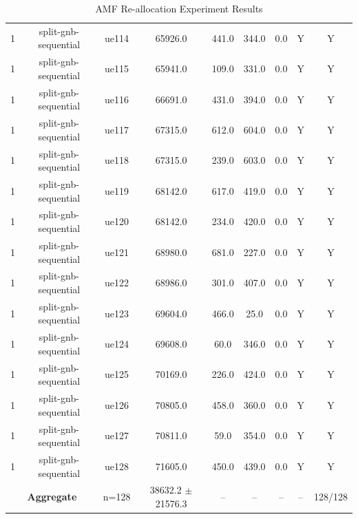 \begin{table}[ht]
\begin{tabular}{|c|c|c|c|c|c|c|c|c|}
1 & split-gnb-sequential & ue114 & 65926.0 & 441.0 & 344.0 & 0.0 & Y & Y \\
1 & split-gnb-sequential & ue115 & 65941.0 & 109.0 & 331.0 & 0.0 & Y & Y \\
1 & split-gnb-sequential & ue116 & 66691.0 & 431.0 & 394.0 & 0.0 & Y & Y \\
1 & split-gnb-sequential & ue117 & 67315.0 & 612.0 & 604.0 & 0.0 & Y & Y \\
1 & split-gnb-sequential & ue118 & 67315.0 & 239.0 & 603.0 & 0.0 & Y & Y \\
1 & split-gnb-sequential & ue119 & 68142.0 & 617.0 & 419.0 & 0.0 & Y & Y \\
1 & split-gnb-sequential & ue120 & 68142.0 & 234.0 & 420.0 & 0.0 & Y & Y \\
1 & split-gnb-sequential & ue121 & 68980.0 & 681.0 & 227.0 & 0.0 & Y & Y \\
1 & split-gnb-sequential & ue122 & 68986.0 & 301.0 & 407.0 & 0.0 & Y & Y \\
1 & split-gnb-sequential & ue123 & 69604.0 & 466.0 & 25.0 & 0.0 & Y & Y \\
1 & split-gnb-sequential & ue124 & 69608.0 & 60.0 & 346.0 & 0.0 & Y & Y \\
1 & split-gnb-sequential & ue125 & 70169.0 & 226.0 & 424.0 & 0.0 & Y & Y \\
1 & split-gnb-sequential & ue126 & 70805.0 & 458.0 & 360.0 & 0.0 & Y & Y \\
1 & split-gnb-sequential & ue127 & 70811.0 & 59.0 & 354.0 & 0.0 & Y & Y \\
1 & split-gnb-sequential & ue128 & 71605.0 & 450.0 & 439.0 & 0.0 & Y & Y \\
\multicolumn{2}{|c|}{\textbf{Aggregate}} & n=128 & 38632.2 $\pm$ 21576.3 & -- & -- & -- & -- & 128/128 \\
\hline
\end{tabular}
\caption{AMF Re-allocation Experiment Results}
\label{tab:amf_realloc}
\end{table}
